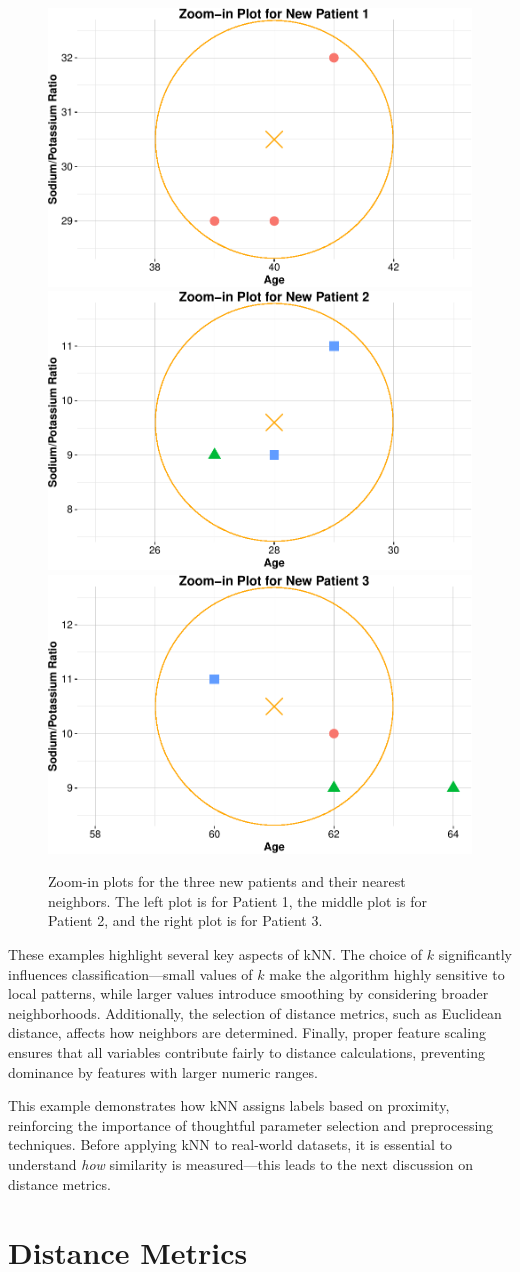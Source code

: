 \documentclass[
]{book}
\theoremstyle{definition}
\theoremstyle{definition}
\theoremstyle{definition}
\theoremstyle{definition}
\theoremstyle{remark}
\begin{document}
\begin{figure}
\includegraphics[width=0.33\linewidth]{knn_files/figure-latex/scatter-plot-ex-drug-3-1} \includegraphics[width=0.33\linewidth]{knn_files/figure-latex/scatter-plot-ex-drug-3-2} \includegraphics[width=0.33\linewidth]{knn_files/figure-latex/scatter-plot-ex-drug-3-3} \caption{Zoom-in plots for the three new patients and their nearest neighbors. The left plot is for Patient 1, the middle plot is for Patient 2, and the right plot is for Patient 3.}\label{fig:scatter-plot-ex-drug-3}
\end{figure}

These examples highlight several key aspects of kNN. The choice of \(k\) significantly influences classification---small values of \(k\) make the algorithm highly sensitive to local patterns, while larger values introduce smoothing by considering broader neighborhoods. Additionally, the selection of distance metrics, such as Euclidean distance, affects how neighbors are determined. Finally, proper feature scaling ensures that all variables contribute fairly to distance calculations, preventing dominance by features with larger numeric ranges.

This example demonstrates how kNN assigns labels based on proximity, reinforcing the importance of thoughtful parameter selection and preprocessing techniques. Before applying kNN to real-world datasets, it is essential to understand \emph{how} similarity is measured---this leads to the next discussion on distance metrics.

\section{Distance Metrics}\label{distance-metrics}
\end{document}
